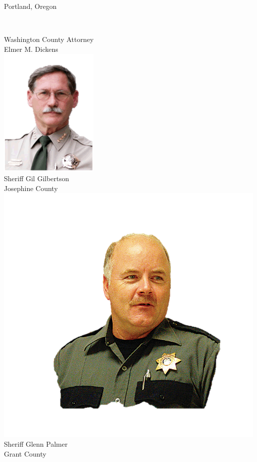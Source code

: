 \begin{frame}{Portland, Oregon}
\begin{columns}[onlytextwidth]
            \\ Washington County Attorney \\ Elmer M. Dickens \\

            \centering
            \includegraphics[height=0.28\textheight]{img/gil-gilbertson.png}
            \\ Sheriff Gil Gilbertson \\ Josephine County \\
            \includegraphics[height=0.28\textheight]{img/glenn-palmer.png}
            \\ Sheriff Glenn Palmer \\ Grant County \\

    \end{columns}
\end{frame}

